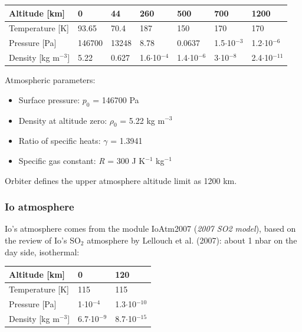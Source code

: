 \documentclass[Orbiter Developer Manual.tex]{subfiles}
\begin{document}
	\begin{longtable}{ |p{}|p{}|p{}|p{}|p{}|p{}|p{}| }
	\hline\rule{0pt}{2ex}
	Altitude [km] & 0 & 44 & 260 & 500 & 700 & 1200\\
	\hline\rule{0pt}{2ex}
	Temperature [K] & 93.65 & 70.4 & 187 & 150 & 170 & 170\\
	\hline\rule{0pt}{2ex}
	Pressure [Pa] & 146700 & 13248 & 8.78 & 0.0637 & 1.5$\cdot$10$^{-3}$ & 1.2$\cdot$10$^{-6}$\\
	\hline\rule{0pt}{2ex}
	Density [kg m$^{-3}$] & 5.22 & 0.627 & 1.6$\cdot$10$^{-4}$ & 1.4$\cdot$10$^{-6}$ & 3$\cdot$10$^{-8}$ & 2.4$\cdot$10$^{-11}$\\
	\hline
	\end{longtable}

\noindent
Atmospheric parameters:

\begin{itemize}
\item Surface pressure: $p_{0}$ = 146700 Pa
\item Density at altitude zero: $\rho_{0}$ = 5.22 kg m$^{-3}$
\item Ratio of specific heats: $\gamma$ = 1.3941
\item Specific gas constant: \textit{R} = 300 J K$^{-1}$ kg$^{-1}$
\end{itemize}

\noindent
Orbiter defines the upper atmosphere altitude limit as 1200 km.


\subsubsection{Io atmosphere}
Io's atmosphere comes from the module IoAtm2007 (\textit{2007 SO2 model}), based on the review of Io's SO$_{2}$ atmosphere by Lellouch et al. (2007): about 1 nbar on the day side, isothermal:

	\begin{longtable}{ |p{}|p{}|p{}| }
	\hline\rule{0pt}{2ex}
	Altitude [km] & 0 & 120\\
	\hline\rule{0pt}{2ex}
	Temperature [K] & 115 & 115\\
	\hline\rule{0pt}{2ex}
	Pressure [Pa] & 1$\cdot$10$^{-4}$ & 1.3$\cdot$10$^{-10}$\\
	\hline\rule{0pt}{2ex}
	Density [kg m$^{-3}$] & 6.7$\cdot$10$^{-9}$ & 8.7$\cdot$10$^{-15}$\\
	\hline
	\end{longtable}
\end{document}
